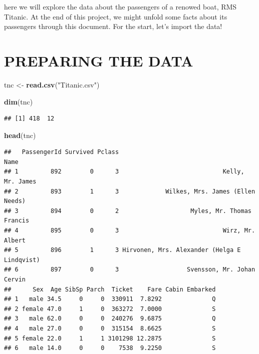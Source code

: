 \documentclass[
]{article}
\newenvironment{Shaded}{\begin{snugshade}}{\end{snugshade}}
\newcommand{\FunctionTok}[1]{\textcolor[rgb]{1.00,0.58,0.35}{\textbf{#1}}}
\newcommand{\NormalTok}[1]{\textcolor[rgb]{0.74,0.68,0.62}{#1}}
\newcommand{\OtherTok}[1]{\textcolor[rgb]{0.74,0.68,0.62}{#1}}
\newcommand{\StringTok}[1]{\textcolor[rgb]{0.02,0.61,0.04}{#1}}
\begin{document}
here we will explore the data about the passengers of a renowed boat,
RMS Titanic. At the end of this project, we might unfold some facts
about its passengers through this document. For the start, let's import
the data!

\hypertarget{preparing-the-data}{%
\section{PREPARING THE DATA}\label{preparing-the-data}}

\begin{Shaded}
\begin{Highlighting}[]
\NormalTok{tnc }\OtherTok{\textless{}{-}} \FunctionTok{read.csv}\NormalTok{(}\StringTok{"Titanic.csv"}\NormalTok{)}
\end{Highlighting}
\end{Shaded}

\begin{Shaded}
\begin{Highlighting}[]
\FunctionTok{dim}\NormalTok{(tnc)}
\end{Highlighting}
\end{Shaded}

\begin{verbatim}
## [1] 418  12
\end{verbatim}

\begin{Shaded}
\begin{Highlighting}[]
\FunctionTok{head}\NormalTok{(tnc)}
\end{Highlighting}
\end{Shaded}

\begin{verbatim}
##   PassengerId Survived Pclass                                         Name
## 1         892        0      3                             Kelly, Mr. James
## 2         893        1      3             Wilkes, Mrs. James (Ellen Needs)
## 3         894        0      2                    Myles, Mr. Thomas Francis
## 4         895        0      3                             Wirz, Mr. Albert
## 5         896        1      3 Hirvonen, Mrs. Alexander (Helga E Lindqvist)
## 6         897        0      3                   Svensson, Mr. Johan Cervin
##      Sex  Age SibSp Parch  Ticket    Fare Cabin Embarked
## 1   male 34.5     0     0  330911  7.8292              Q
## 2 female 47.0     1     0  363272  7.0000              S
## 3   male 62.0     0     0  240276  9.6875              Q
## 4   male 27.0     0     0  315154  8.6625              S
## 5 female 22.0     1     1 3101298 12.2875              S
## 6   male 14.0     0     0    7538  9.2250              S
\end{verbatim}
\end{document}
